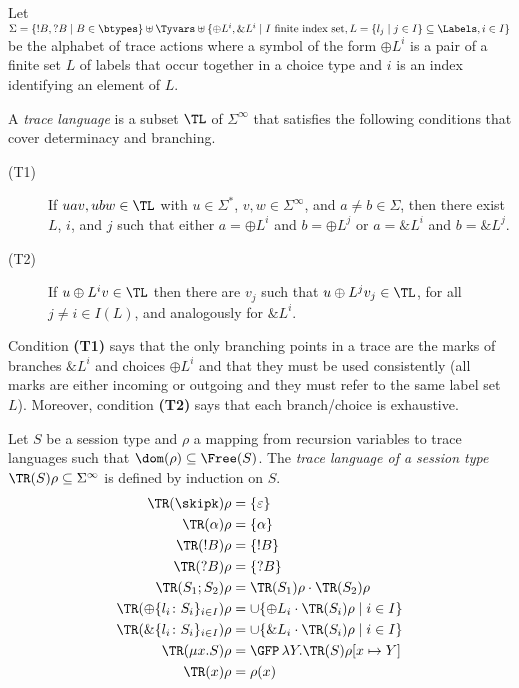 \begin{definition}
  Let $\Sigma = \{ {!B}, {?B} \mid B \in \btypes\} \uplus \Tyvars \uplus \{ {\oplus L^i}, {\& L^i} \mid I
  \text{ finite index set}, L =  \{l_j \mid j\in I\}
  \subseteq \Labels, i \in I  \}$ be the alphabet of trace actions where
  a symbol of the form $\oplus L^i$ is a pair of a finite set $L$ of labels that occur together in a choice type and $i$
  is an index identifying an element of $L$. 

 
A \emph{trace language} is a subset $\TL$ of $\Sigma^\infty$ that
satisfies the following conditions that cover determinacy and
branching.


  \begin{description}
  \item[(T1)] If $uav, ubw \in {\TL}$ with $u\in\Sigma^*$, $v,w \in \Sigma^\infty$, and
    $a \ne b \in \Sigma$, then there exist $L$, $i$, and $j$ such that either  $a=\oplus L^i$ and $b=\oplus L^j$ or $a=\& L^i$ and $b=\& L^j$.
  \item[(T2)]
    If $u\oplus L^i v \in {\TL}$ then there are $v_j$ such that $u\oplus L^jv_j \in {\TL}$, for all $j\ne i \in I (L)$, and
  analogously for $\& L^i$.
  \end{description}
\end{definition}
Condition \textbf{(T1)} says that the only branching points in a trace are the marks of branches
$\& L^i$ and choices $\oplus L^i$ and that they must be used consistently (all marks are either incoming or
outgoing and they must refer to the same label set $L$). Moreover, condition \textbf{(T2)} says that
each branch/choice is exhaustive. 

\begin{definition}\label{def:trace-language}
  Let $S$ be a session type and $\rho$ a mapping from recursion variables to trace languages such
  that $\dom (\rho) \subseteq \Free (S)$.
  The \emph{trace language of a session type} $\TR (S)\rho \subseteq \Sigma^\infty$ is defined by
  induction on $S$.
  \begin{align*}
    \TR (\skipk)\rho &= \{ \varepsilon \} \\
    \TR (\alpha)\rho &= \{ \alpha \} \\
    \TR (!B)\rho &= \{ !B \} \\
    \TR (?B)\rho &= \{ ?B \} \\
    \TR (S_1;S_2)\rho &= \TR (S_1)\rho \cdot \TR (S_2)\rho \\
    \TR (\oplus\{l_i\colon S_i\}_{i\in I})\rho &= {\cup} \{  {\oplus L_i} \cdot \TR (S_i)\rho \mid {i\in I} \} \\
    \TR (\&\{l_i\colon S_i\}_{{i\in I}})\rho &=  {\cup} \{ {\& L_i} \cdot \TR (S_i)\rho \mid {i\in I} \} \\
    \TR (\mu x.S)\rho &= \GFP\, \lambda Y. \TR (S)\rho[x\mapsto Y] \\
    \TR (x) \rho & = \rho (x)
  \end{align*}
\end{definition}

